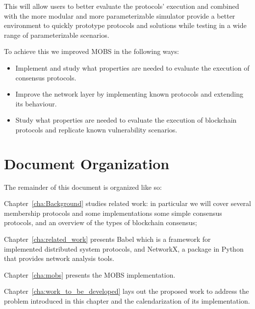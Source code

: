 This will allow users to better evaluate the protocols' execution and combined with the more modular and more
parameterizable simulator provide a better environment to quickly prototype protocols and solutions while testing in
a wide range of parameterizable scenarios.

To achieve this we improved MOBS in the following ways:
\begin{itemize}
  \item Implement and study what properties are needed to evaluate the execution of consensus protocols.
  \item Improve the network layer by implementing known protocols and extending its behaviour.
  \item Study what properties are needed to evaluate the execution of blockchain protocols and replicate known
    vulnerability scenarios.
\end{itemize}
\section{Document Organization}\label{sub:document_organization}

The remainder of this document is organized like so:

Chapter~\ref{cha:Background} studies related work: in particular we will cover several membership protocols and some implementations
some simple consensus protocols, and an overview of the types of blockchain consensus;


Chapter~\ref{cha:related_work} presents Babel which is a framework for implemented distributed system protocols, and NetworkX,
a package in Python that provides network analysis tools.

Chapter~\ref{cha:mobs} presents the MOBS implementation.

Chapter~\ref{cha:work_to_be_developed} lays out the proposed work to address the problem
introduced in this chapter and the calendarization of its implementation.
